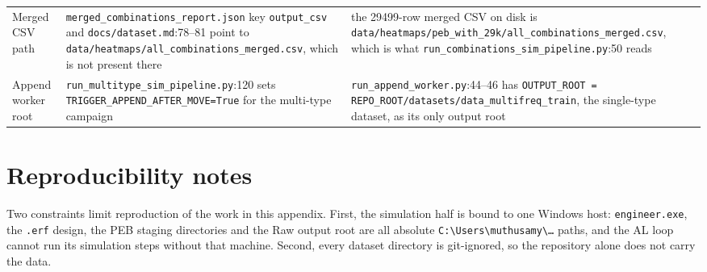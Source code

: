 \begin{table}[htbp]
\begin{tabular}{p{} p{} p{}}
Merged CSV path &
\texttt{merged\_combinations\_report.json} key \texttt{output\_csv} and
\texttt{docs/dataset.md}:78--81 point to
\texttt{data/\allowbreak{}heatmaps/\allowbreak{}all\_\allowbreak{}combinations\_\allowbreak{}merged.csv}, which is not present there &
the 29499-row merged CSV on disk is
\texttt{data/\allowbreak{}heatmaps/\allowbreak{}peb\_\allowbreak{}with\_\allowbreak{}29k/\allowbreak{}all\_\allowbreak{}combinations\_\allowbreak{}merged.csv}, which is what
\texttt{run\_\allowbreak{}combinations\_\allowbreak{}sim\_\allowbreak{}pipeline.py}:50 reads \\
Append worker root &
\texttt{run\_multitype\_sim\_pipeline.py}:120 sets
\texttt{TRIGGER\_APPEND\_AFTER\_MOVE=True} for the multi-type campaign &
\texttt{run\_append\_worker.py}:44--46 has \texttt{OUTPUT\_\allowbreak{}ROOT =
REPO\_\allowbreak{}ROOT/\allowbreak{}datasets/\allowbreak{}data\_\allowbreak{}multifreq\_\allowbreak{}train}, the single-type dataset, as its only output root \\
\hline
\end{tabular}
\end{table}


\section{Reproducibility notes}
\label{sec:appA_repro}

Two constraints limit reproduction of the work in this appendix. First, the simulation half is
bound to one Windows host: \texttt{engineer.exe}, the \texttt{.erf} design, the PEB staging
directories and the Raw output root are all absolute
\texttt{C:\textbackslash{}Users\textbackslash{}muthusamy\textbackslash{}\ldots} paths, and the AL
loop cannot run its simulation steps without that machine. Second, every dataset directory is
git-ignored, so the repository alone does not carry the data.




